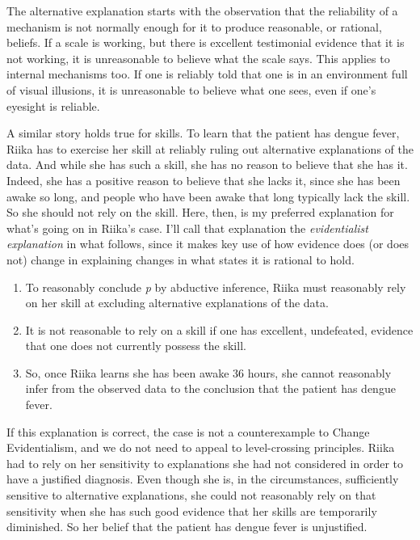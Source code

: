 \documentclass[
  10pt,
  letterpaper,
  twoside]{scrbook}
\providecommand{\tightlist}{%
  \setlength{\itemsep}{0pt}\setlength{\parskip}{0pt}}\usepackage{longtable,booktabs,array}
\begin{document}
The alternative explanation starts with the observation that the
reliability of a mechanism is not normally enough for it to produce
reasonable, or rational, beliefs. If a scale is working, but there is
excellent testimonial evidence that it is not working, it is
unreasonable to believe what the scale says. This applies to internal
mechanisms too. If one is reliably told that one is in an environment
full of visual illusions, it is unreasonable to believe what one sees,
even if one's eyesight is reliable.

A similar story holds true for skills. To learn that the patient has
dengue fever, {Riika} has to exercise her skill at reliably ruling out
alternative explanations of the data. And while she has such a skill,
she has no reason to believe that she has it. Indeed, she has a positive
reason to believe that she lacks it, since she has been awake so long,
and people who have been awake that long typically lack the skill. So
she should not rely on the skill. Here, then, is my preferred
explanation for what's going on in {Riika}'s case. I'll call that
explanation the \emph{evidentialist explanation} in what follows, since
it makes key use of how evidence does (or does not) change in explaining
changes in what states it is rational to hold.

\begin{enumerate}
\def\labelenumi{\arabic{enumi}.}
\tightlist
\item
  To reasonably conclude \emph{p} by abductive inference, {Riika} must
  reasonably rely on her skill at excluding alternative explanations of
  the data.
\item
  It is not reasonable to rely on a skill if one has excellent,
  undefeated, evidence that one does not currently possess the skill.
\item
  So, once {Riika} learns she has been awake 36 hours, she cannot
  reasonably infer from the observed data to the conclusion that the
  patient has dengue fever.
\end{enumerate}

If this explanation is correct, the case is not a counterexample to
Change Evidentialism, and we do not need to appeal to level-crossing
principles. {Riika} had to rely on her sensitivity to explanations she
had not considered in order to have a justified diagnosis. Even though
she is, in the circumstances, sufficiently sensitive to alternative
explanations, she could not reasonably rely on that sensitivity when she
has such good evidence that her skills are temporarily diminished. So
her belief that the patient has dengue fever is unjustified.
\end{document}
